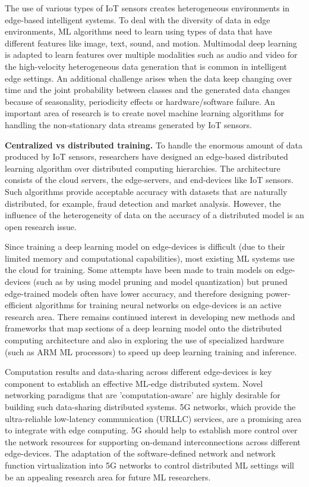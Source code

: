 \documentclass[letterpaper, 10 pt, conference]{ieeeconf}
\begin{document}
The use of various types of IoT sensors creates heterogeneous environments in edge-based intelligent systems. To deal with the diversity of data in edge environments, ML algorithms need to learn using types of data that have different features like image, text, sound, and motion. Multimodal deep learning is adapted to learn features over multiple modalities such as audio and video\cite{Ngiam_Khosla_Kim_Nam_Lee_Ng_2011} for the high-velocity heterogeneous data generation that is common in intelligent edge settings. An additional challenge arises when the data keep changing over time and the joint probability between classes and the generated data changes because of seasonality, periodicity effects or hardware/software failure. An important area of research is to create novel machine learning algorithms for handling the non-stationary data streams generated by IoT sensors\cite{Ditzler_Roveri_Alippi_Polikar_2015}.

\textbf{Centralized vs distributed training.} To handle the enormous amount of data produced by IoT sensors, researchers have designed an edge-based distributed learning algorithm over distributed computing hierarchies. The architecture consists of the cloud servers, the edge-servers, and end-devices like IoT sensors. Such algorithms provide acceptable accuracy with datasets that are naturally distributed, for example, fraud detection and market analysis. However, the influence of the heterogeneity of data on the accuracy of a distributed model is an open research issue\cite{Peteiro-Barral_Guijarro-Berdiñas_2013}.

Since training a deep learning model on edge-devices is difficult (due to their limited memory and computational capabilities), most existing ML systems use the cloud for training. Some attempts have been made to train models on edge-devices (such as by using model pruning and model quantization) but pruned edge-trained models often have lower accuracy, and therefore designing power-efficient algorithms for training neural networks on edge-devices is an active research area. There remains continued interest in developing new methods and frameworks that map sections of a deep learning model onto the distributed computing architecture and also in exploring the use of specialized hardware (such as ARM ML processors) to speed up deep learning training and inference.

Computation results and data-sharing across different edge-devices is key component to establish an effective ML-edge distributed system. Novel networking paradigms that are 'computation-aware' are highly desirable for building such data-sharing distributed systems. 5G networks, which provide the ultra-reliable low-latency communication (URLLC) services, are a promising area to integrate with edge computing. 5G should help to establish more control over the network resources for supporting on-demand interconnections across different edge-devices. The adaptation of the software-defined network and network function virtualization into 5G networks to control distributed ML settings will be an appealing research area for future ML researchers.
\end{document}
